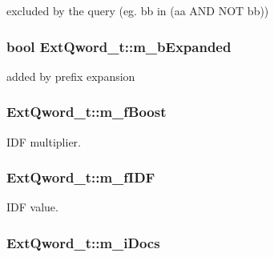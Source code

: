 excluded by the query (eg. bb in (aa A\-N\-D N\-O\-T bb)) 

\hypertarget{structExtQword__t_abcc8f28c4b32c3d77dd12125dbf1aa85}{
\subsubsection[{m\-\_\-b\-Expanded}]{\setlength{\rightskip}{0pt plus 5cm}bool Ext\-Qword\-\_\-t\-::m\-\_\-b\-Expanded}}\label{structExtQword__t_abcc8f28c4b32c3d77dd12125dbf1aa85}


added by prefix expansion 

\hypertarget{structExtQword__t_a9d768cd56ec045a79ebb3f300de53b81}{
\subsubsection[{m\-\_\-f\-Boost}]{ Ext\-Qword\-\_\-t\-::m\-\_\-f\-Boost}}\label{structExtQword__t_a9d768cd56ec045a79ebb3f300de53b81}


I\-D\-F multiplier. 

\hypertarget{structExtQword__t_a60b641a3ed4bf36f28068e07e9cabffe}{
\subsubsection[{m\-\_\-f\-I\-D\-F}]{ Ext\-Qword\-\_\-t\-::m\-\_\-f\-I\-D\-F}}\label{structExtQword__t_a60b641a3ed4bf36f28068e07e9cabffe}


I\-D\-F value. 

\hypertarget{structExtQword__t_a42c3aaa1179294b46d1238bdbb29d59e}{
\subsubsection[{m\-\_\-i\-Docs}]{ Ext\-Qword\-\_\-t\-::m\-\_\-i\-Docs}}\label{structExtQword__t_a42c3aaa1179294b46d1238bdbb29d59e}


